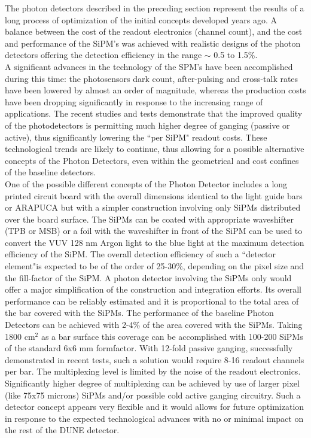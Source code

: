  The photon detectors described in the preceding section represent the results of a long process of optimization of the initial concepts developed years ago. A balance between the cost of the readout electronics (channel count), and the cost and performance of the SiPM's was achieved with realistic designs of the photon detectors offering the detection efficiency in the range $\sim$ 0.5 to 1.5\%.\\
A significant advances in the technology of the SPM's have been accomplished during this time: the photosensors dark count, after-pulsing and cross-talk rates have been lowered by almost an order of magnitude, whereas the production costs have been dropping significantly in response to the increasing range of applications.  The recent studies and tests demonstrate that the improved quality of the photodetectors is permitting much higher degree of ganging (passive or active), thus significantly lowering the ``per SiPM" readout costs.
These technological trends are likely to continue, thus allowing for a possible alternative concepts of the Photon Detectors, even within the geometrical and cost confines of the baseline detectors.\\
One of the possible different concepts of the Photon Detector includes a long printed circuit board with the overall dimensions identical to the light guide bars or ARAPUCA but with a simpler construction involving only SiPMs distributed over the board surface. The SiPMs can be coated with  appropriate waveshifter (TPB or MSB) or a foil with the waveshifter in front of the SiPM can be used to convert the VUV 128 nm Argon light to the blue light at the maximum detection efficiency of the SiPM. The overall detection efficiency of such a ``detector element"is expected to be of the order of 25-30\%, depending on the pixel size and the fill-factor of the SiPM.
A photon detector involving the SiPMs only would offer a major simplification of the construction and integration efforts. Its overall performance can be reliably estimated and it is proportional to the total area of the bar covered with the SiPMs.
The performance of the baseline Photon Detectors can be achieved with 2-4\% of the area covered with the SiPMs. Taking 1800 cm$^2$ as a bar surface this coverage can be accomplished with 100-200 SiPMs of the standard 6x6 mm formfactor. With 12-fold passive ganging, successfully demonstrated in recent tests, such a solution would require 8-16 readout channels per bar. The multiplexing level is limited by the noise of the readout electronics. Significantly higher degree of multiplexing can be achieved by use of larger pixel (like 75x75 microns) SiPMs and/or possible cold active ganging circuitry. 
Such a detector concept appears very flexible and it would allows for future optimization in response to the expected technological advances with no or minimal impact on the rest of the DUNE  detector. 



